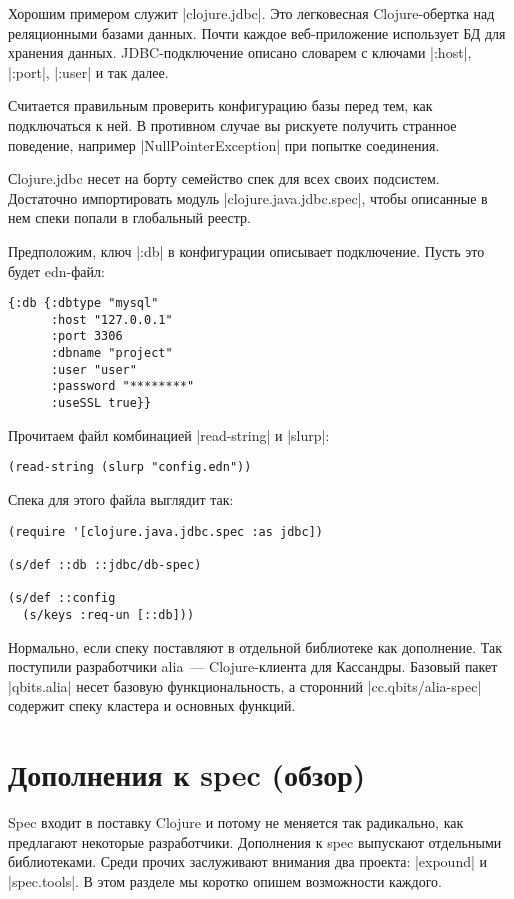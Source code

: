 Хорошим примером служит \spverb|clojure.jdbc|. Это легковесная Clojure-обертка над
реляционными базами данных. Почти каждое веб-приложение использует БД для
хранения данных. JDBC-подключение описано словарем с ключами \spverb|:host|, \spverb|:port|,
\spverb|:user| и так далее.

Считается правильным проверить конфигурацию базы перед тем, как подключаться к
ней. В противном случае вы рискуете получить странное поведение, например
\spverb|NullPointerException| при попытке соединения.

Сlojure.jdbc несет на борту семейство спек для всех своих подсистем. Достаточно
импортировать модуль \spverb|clojure.java.jdbc.spec|, чтобы описанные в нем спеки
попали в глобальный реестр.

Предположим, ключ \spverb|:db| в конфигурации описывает подключение. Пусть это будет
edn-файл:

\begin{verbatim}
{:db {:dbtype "mysql"
      :host "127.0.0.1"
      :port 3306
      :dbname "project"
      :user "user"
      :password "********"
      :useSSL true}}
\end{verbatim}

Прочитаем файл комбинацией \spverb|read-string| и \spverb|slurp|:

\begin{verbatim}
(read-string (slurp "config.edn"))
\end{verbatim}

Спека для этого файла выглядит так:

\begin{verbatim}
(require '[clojure.java.jdbc.spec :as jdbc])

(s/def ::db ::jdbc/db-spec)

(s/def ::config
  (s/keys :req-un [::db]))
\end{verbatim}

Нормально, если спеку поставляют в отдельной библиотеке как дополнение. Так
поступили разработчики alia~--- Clojure-клиента для Кассандры. Базовый пакет
\spverb|qbits.alia| несет базовую функциональность, а сторонний \spverb|cc.qbits/alia-spec|
содержит спеку кластера и основных функций.

\section{Дополнения к spec (обзор)}

Spec входит в поставку Clojure и потому не меняется так радикально, как
предлагают некоторые разработчики. Дополнения к spec выпускают отдельными
библиотеками. Среди прочих заслуживают внимания два проекта: \spverb|expound| и
\spverb|spec.tools|. В этом разделе мы коротко опишем возможности каждого.

